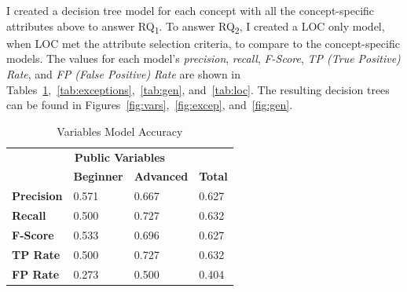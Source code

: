 I created a decision tree model for each concept with all the concept-specific attributes above to answer RQ\textsubscript{1}. To answer RQ\textsubscript{2}, I created a LOC only model, when LOC met the attribute selection criteria, to compare to the concept-specific models.
The values for each model's \emph{precision}, \emph{recall}, \emph{F-Score}, \emph{TP (True Positive) Rate}, and \emph{FP (False Positive) Rate} are shown in Tables~\ref{tab:vars},~\ref{tab:exceptions},~\ref{tab:gen}, and~\ref{tab:loc}. The resulting decision trees can be found in Figures~\ref{fig:vars},~\ref{fig:excep}, and~\ref{fig:gen}.

\begin{table}
	\centering
	\caption{Variables Model Accuracy}
	\label{tab:vars}
	\begin{tabular}{llll}
		\toprule
		\multicolumn{4}{c}{\textbf{Public Variables}}                               \\
		\cmidrule(lr){1-4}
		& \textbf{Beginner} & \textbf{Advanced} & \textbf{Total} \\
		\midrule
		\textbf{Precision} & 0.571             & 0.667             & 0.627          \\
		\textbf{Recall}    & 0.500             & 0.727             & 0.632          \\
		\textbf{F-Score}   & 0.533             & 0.696             & 0.627          \\
		\textbf{TP Rate}   & 0.500             & 0.727             & 0.632          \\
		\textbf{FP Rate}   & 0.273             & 0.500             & 0.404   \\
		\bottomrule
		
	\end{tabular}
\end{table}

